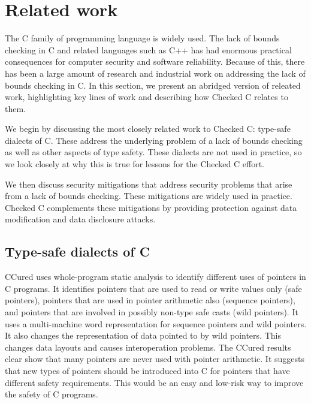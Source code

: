 
\chapter{Related work}
\label{chapter:lessons}

The C family of programming language is widely used.  The lack of
bounds checking in C and related languages such as C++ has had
enormous practical consequences for computer security and software 
reliability.  Because of this, there has been a large amount of
research and industrial work on addressing the lack of bounds
checking in C.  In this section, we present an abridged version of 
releated work,  highlighting key lines of work and
describing how Checked C relates to them. 

We begin by discussing the most closely related work to Checked C:
type-safe dialects of C.  These address the underlying problem of
a lack of bounds checking as well as other aspects of type safety.
These dialects are not used in practice, so we look closely at why
this is true for lessons for the Checked C effort.

We then discuss security mitigations that address
security problems that arise from a lack of bounds checking.
These mitigations are widely used in practice.   Checked C
complements these mitigations by providing protection against data
modification and data disclosure attacks.

\section{Type-safe dialects of C}

CCured \cite{Necula2005} uses whole-program static analysis to identify 
different uses of pointers in C programs. It identifies pointers that are used to
read or write values only (safe pointers), pointers that are used in pointer
arithmetic also (sequence pointers), and pointers that are involved in
possibly non-type safe casts (wild pointers). It uses a multi-machine
word representation for sequence pointers and wild pointers. It also
changes the representation of data pointed to by wild pointers. This
changes data layouts and causes interoperation problems. The CCured
results clear show that many pointers are never used with pointer
arithmetic. It suggests that new types of pointers should be introduced
into C for pointers that have different safety requirements. This would
be an easy and low-risk way to improve the safety of C programs.

